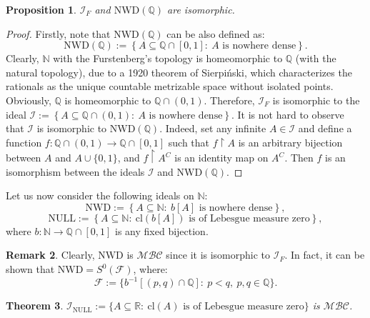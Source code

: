 \documentclass{amsart}
\newtheorem{thm}{Theorem}[section]
\newtheorem{prop}[thm]{Proposition}
\theoremstyle{definition}
\newtheorem{remark}[thm]{Remark}
\newcommand{\N}{{\mathbb N}}
\newcommand{\R}{{\mathbb R}}
\newcommand{\Q}{{\mathbb Q}}
\newcommand{\I}{\mathcal I}
\newcommand{\MB}{S^0}
\newcommand{\MBC}{\mathcal{MBC}}
\newcommand{\NULL}{\mathrm{NULL}}
\newcommand{\NWD}{\mathrm{NWD}}
\newcommand{\INULL}{\I_\mathrm{NULL}}
\newcommand{\cl}{\mathrm{cl}}
\begin{document}
\begin{prop}
$\I_F$ and $\NWD(\Q)$ are isomorphic.
\end{prop}

\begin{proof}
Firstly, note that $\NWD(\Q)$ can be also defined as:
$$\NWD(\Q) := \left\{A\subseteq\mathbb{Q}\cap [0,1] :\ A \textrm{ is nowhere dense}\right\}.$$
Clearly, $\N$ with the Furstenberg's topology is homeomorphic to $\Q$ (with the natural topology), due to a 1920 theorem of Sierpi\'nski, which characterizes the rationals as the unique countable metrizable space without isolated points. Obviously, $\Q$ is homeomorphic to $\Q\cap (0,1)$. Therefore, $\I_F$ is isomorphic to the ideal $\I := \left\{A\subseteq\Q\cap (0,1) :\ A \textrm{ is nowhere dense}\right\}$. It is not hard to observe that $\I$ is isomorphic to $\NWD(\Q)$. Indeed, set any infinite $A\in\I$ and define a function $f \colon \Q\cap (0,1) \to \Q\cap [0,1]$ such that $f\upharpoonright A$ is an arbitrary bijection between $A$ and $A\cup\{0,1\}$, and $f\upharpoonright A^C$ is an identity map on $A^C$. Then $f$ is an isomorphism between the ideals $\I$ and $\NWD(\Q)$.
\end{proof}

Let us now consider the following ideals on $\N$:
$$\NWD :=\left\{A\subseteq\N :\ b[A] \textrm{ is nowhere dense}\right\},$$
$$\NULL :=\left\{A\subseteq\N :\ \cl(b[A]) \textrm{ is of Lebesgue measure zero}\right\},$$
where $b\colon\N\to\Q\cap [0,1]$ is any fixed bijection.

\begin{remark}
Clearly, $\NWD$ is $\MBC$ since it is isomorphic to $\I_F$. In fact, it can be shown that $\NWD = \MB(\mathcal{F})$, where:
$$\mathcal{F} := \{b^{-1}[(p, q)\cap\Q] :\ p < q,\ p, q \in \Q\}.$$
\end{remark}

\begin{thm}
$\INULL := \{A \subseteq\R :\ \cl(A) \textrm{ is of Lebesgue measure zero}\}$ is $\MBC$.
\end{thm}
\end{document}
